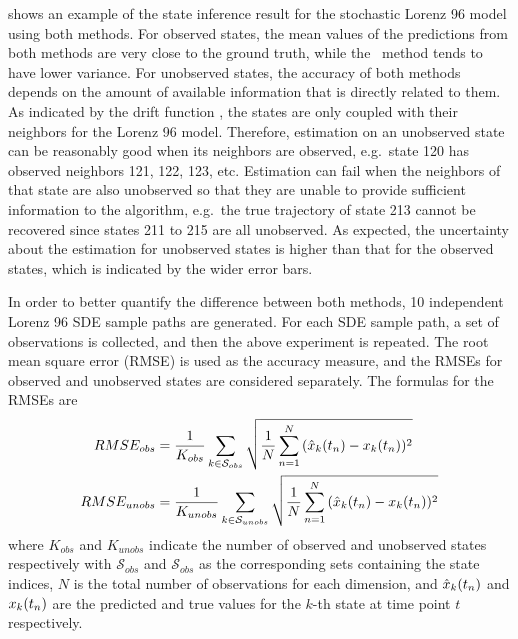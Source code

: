  shows an example of the state inference result for the stochastic Lorenz 96 model using both methods.
For observed states, the mean values of the predictions from both methods are very close to the ground truth, while the \algovgpamf\ method tends to have lower variance.
For unobserved states, the accuracy of both methods depends on the amount of available information that is directly related to them.
As indicated by the drift function , the states are only coupled with their  neighbors for the Lorenz 96 model.
Therefore, estimation on an unobserved state can be reasonably good when its neighbors are observed, e.g.\ state 120 has observed neighbors 121, 122, 123, etc.
Estimation can fail when the neighbors of that state are also unobserved so that they are unable to provide sufficient information to the algorithm, e.g.\ the true trajectory of state 213 cannot be recovered since states 211 to 215 are all unobserved.
As expected, the uncertainty about the estimation for unobserved states is higher than that for the observed states, which is indicated by the wider error bars.

In order to better quantify the difference between both methods, 10 independent Lorenz 96 SDE sample paths are generated. 
For each SDE sample path, a set of observations is collected, and then the above experiment is repeated.
The root mean square error (RMSE) is used as the accuracy measure, and the RMSEs for observed and unobserved states are considered separately.
The formulas for the RMSEs are
\begin{align}
    RMSE_{obs} 
    & = \frac{1}{K_{obs}}\sum_{k\in \mathcal{S}_{obs}}{\sqrt{
        \frac{1}{N}\sum_{n=1}^N{
            (\hat{x}_{k}(t_{n}) - x_{k}(t_{n}))^2
        }
    }}
    \\
    RMSE_{unobs} 
    & = \frac{1}{K_{unobs}}\sum_{k\in \mathcal{S}_{unobs}}{\sqrt{
        \frac{1}{N}\sum_{n=1}^N{
            (\hat{x}_{k}(t_{n})-x_{k}(t_{n}))^2
        }
    }}    
\end{align}
where $K_{obs}$ and $K_{unobs}$ indicate the number of observed and unobserved states respectively with $\mathcal{S}_{obs}$ and $\mathcal{S}_{obs}$ as the corresponding sets containing the state indices, $N$ is the total number of observations for each dimension, and $\hat{x}_{k}(t_{n})$ and $x_{k}(t_{n})$ are the predicted and true values for the $k$-th state at time point $t$ respectively.


